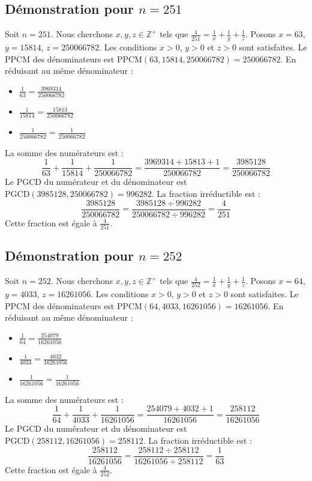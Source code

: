 \documentclass[11pt,a4paper]{article}
\begin{document}
\subsection{Démonstration pour $n = 251$}
Soit $n = 251$. Nous cherchons $x, y, z \in \mathbb{Z}^{+}$ tels que $\frac{4}{251} = \frac{1}{x} + \frac{1}{y} + \frac{1}{z}$.
Posons $x = 63$, $y = 15814$, $z = 250066782$.
Les conditions $x > 0$, $y > 0$ et $z > 0$ sont satisfaites.
Le PPCM des dénominateurs est $\text{PPCM}(63, 15814, 250066782) = 250066782$.
En réduisant au même dénominateur :
\begin{itemize}
    \item $\frac{1}{63} = \frac{3969314}{250066782}$
    \item $\frac{1}{15814} = \frac{15813}{250066782}$
    \item $\frac{1}{250066782} = \frac{1}{250066782}$
\end{itemize}
La somme des numérateurs est :
$$ \frac{1}{63} + \frac{1}{15814} + \frac{1}{250066782} = \frac{3969314 + 15813 + 1}{250066782} = \frac{3985128}{250066782} $$
Le PGCD du numérateur et du dénominateur est $\text{PGCD}(3985128, 250066782) = 996282$.
La fraction irréductible est :
$$ \frac{3985128}{250066782} = \frac{3985128 \div 996282}{250066782 \div 996282} = \frac{4}{251} $$
Cette fraction est égale à $\frac{4}{251}$.

\subsection{Démonstration pour $n = 252$}
Soit $n = 252$. Nous cherchons $x, y, z \in \mathbb{Z}^{+}$ tels que $\frac{4}{252} = \frac{1}{x} + \frac{1}{y} + \frac{1}{z}$.
Posons $x = 64$, $y = 4033$, $z = 16261056$.
Les conditions $x > 0$, $y > 0$ et $z > 0$ sont satisfaites.
Le PPCM des dénominateurs est $\text{PPCM}(64, 4033, 16261056) = 16261056$.
En réduisant au même dénominateur :
\begin{itemize}
    \item $\frac{1}{64} = \frac{254079}{16261056}$
    \item $\frac{1}{4033} = \frac{4032}{16261056}$
    \item $\frac{1}{16261056} = \frac{1}{16261056}$
\end{itemize}
La somme des numérateurs est :
$$ \frac{1}{64} + \frac{1}{4033} + \frac{1}{16261056} = \frac{254079 + 4032 + 1}{16261056} = \frac{258112}{16261056} $$
Le PGCD du numérateur et du dénominateur est $\text{PGCD}(258112, 16261056) = 258112$.
La fraction irréductible est :
$$ \frac{258112}{16261056} = \frac{258112 \div 258112}{16261056 \div 258112} = \frac{1}{63} $$
Cette fraction est égale à $\frac{4}{252}$.
\end{document}
